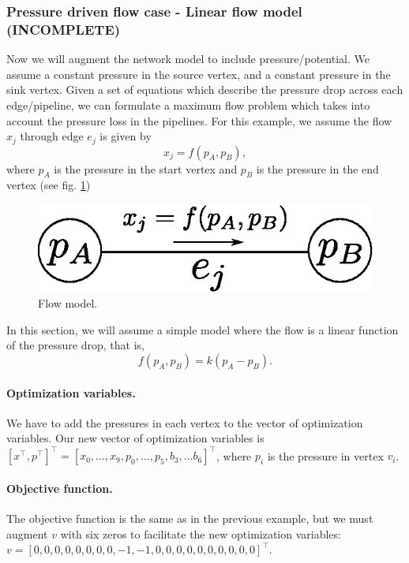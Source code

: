 \subsubsection{Pressure driven flow case - Linear flow model {\color{red} (INCOMPLETE)}}
Now we will augment the network model to include pressure/potential. We assume a constant pressure in the source vertex, and a constant pressure in the sink vertex. Given a set of equations which describe the pressure drop across each edge/pipeline, we can formulate a maximum flow problem which takes into account the pressure loss in the pipelines. For this example, we assume the flow $x_j$ through edge $e_j$ is given by
\[
x_j = f(p_A, p_B),
\]
where $p_A$ is the pressure in the start vertex and $p_B$ is the pressure in the end vertex (see fig. \ref{fig:pressuredrop})
\begin{figure}[H]
\centering
\includegraphics[scale=0.6]{figures/pressuredrop.eps}
\caption{Flow model.}
\label{fig:pressuredrop}
\end{figure}
In this section, we will assume a simple model where the flow is a linear function of the pressure drop, that is,
\[
f(p_A, p_B) = k(p_A - p_B).
\]

\paragraph{Optimization variables.} We have to add the pressures in each vertex to the vector of optimization variables. Our new vector of optimization variables is $[x^\top,p^\top]^\top = [x_0,\dots,x_9,p_0,\dots,p_5,b_3,\dots b_6]^\top$, where $p_i$ is the pressure in vertex $v_i$.

\paragraph{Objective function.} The objective function is the same as in the previous example, but we must augment $v$ with six zeros to facilitate the new optimization variables: $v = [0,0,0,0,0,0,0,0,-1,-1,0,0,0,0,0,0, 0, 0, 0, 0]^\top$.


